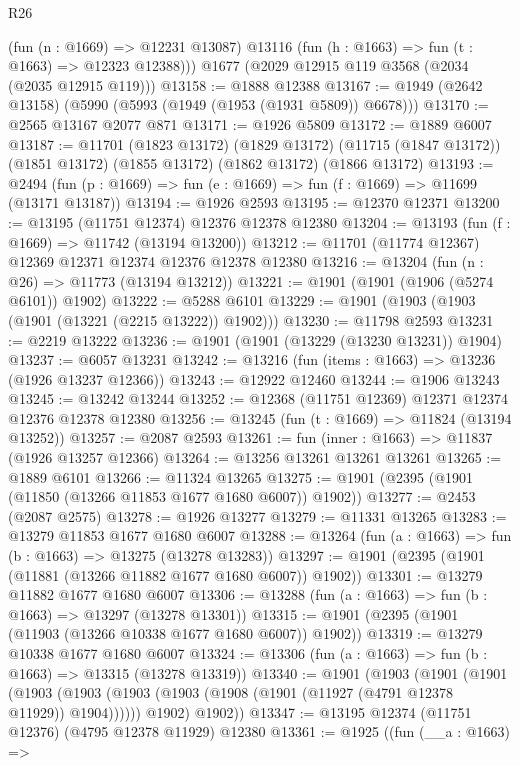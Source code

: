 \begin{lexlean}{R26}
\begin{coremodule}
        (fun (n : @1669) => @12231 @13087)
        @13116
        (fun (h : @1663) => fun (t : @1663) => @12323 @12388)))
    @1677
    (@2029 @12915 @119 @3568 (@2034 (@2035 @12915 @119)))
@13158 := @1888 @12388
@13167 := @1949 (@2642 @13158) (@5990 (@5993 (@1949 (@1953 (@1931 @5809)) @6678)))
@13170 := @2565 @13167 @2077 @871
@13171 := @1926 @5809
@13172 := @1889 @6007
@13187 := @11701
    (@1823 @13172)
    (@1829 @13172)
    (@11715 (@1847 @13172))
    (@1851 @13172)
    (@1855 @13172)
    (@1862 @13172)
    (@1866 @13172)
@13193 := @2494 (fun (p : @1669) => fun (e : @1669) => fun (f : @1669) => @11699 (@13171 @13187))
@13194 := @1926 @2593
@13195 := @12370 @12371
@13200 := @13195 (@11751 @12374) @12376 @12378 @12380
@13204 := @13193 (fun (f : @1669) => @11742 (@13194 @13200))
@13212 := @11701 (@11774 @12367) @12369 @12371 @12374 @12376 @12378 @12380
@13216 := @13204 (fun (n : @26) => @11773 (@13194 @13212))
@13221 := @1901 (@1901 (@1906 (@5274 @6101)) @1902)
@13222 := @5288 @6101
@13229 := @1901 (@1903 (@1903 (@1901 (@13221 (@2215 @13222)) @1902)))
@13230 := @11798 @2593
@13231 := @2219 @13222
@13236 := @1901 (@1901 (@13229 (@13230 @13231)) @1904)
@13237 := @6057 @13231
@13242 := @13216 (fun (items : @1663) => @13236 (@1926 @13237 @12366))
@13243 := @12922 @12460
@13244 := @1906 @13243
@13245 := @13242 @13244
@13252 := @12368 (@11751 @12369) @12371 @12374 @12376 @12378 @12380
@13256 := @13245 (fun (t : @1669) => @11824 (@13194 @13252))
@13257 := @2087 @2593
@13261 := fun (inner : @1663) => @11837 (@1926 @13257 @12366)
@13264 := @13256 @13261 @13261 @13261
@13265 := @1889 @6101
@13266 := @11324 @13265
@13275 := @1901 (@2395 (@1901 (@11850 (@13266 @11853 @1677 @1680 @6007)) @1902))
@13277 := @2453 (@2087 @2575)
@13278 := @1926 @13277
@13279 := @11331 @13265
@13283 := @13279 @11853 @1677 @1680 @6007
@13288 := @13264 (fun (a : @1663) => fun (b : @1663) => @13275 (@13278 @13283))
@13297 := @1901 (@2395 (@1901 (@11881 (@13266 @11882 @1677 @1680 @6007)) @1902))
@13301 := @13279 @11882 @1677 @1680 @6007
@13306 := @13288 (fun (a : @1663) => fun (b : @1663) => @13297 (@13278 @13301))
@13315 := @1901 (@2395 (@1901 (@11903 (@13266 @10338 @1677 @1680 @6007)) @1902))
@13319 := @13279 @10338 @1677 @1680 @6007
@13324 := @13306 (fun (a : @1663) => fun (b : @1663) => @13315 (@13278 @13319))
@13340 := @1901
    (@1903
      (@1901
        (@1901
          (@1903 (@1903 (@1903 (@1903 (@1908 (@1901 (@11927 (@4791 @12378 @11929)) @1904))))))
          @1902)
        @1902))
@13347 := @13195 @12374 (@11751 @12376) (@4795 @12378 @11929) @12380
@13361 := @1925
    ((fun (__a : @1663) =>

\end{coremodule}
\end{lexlean}
